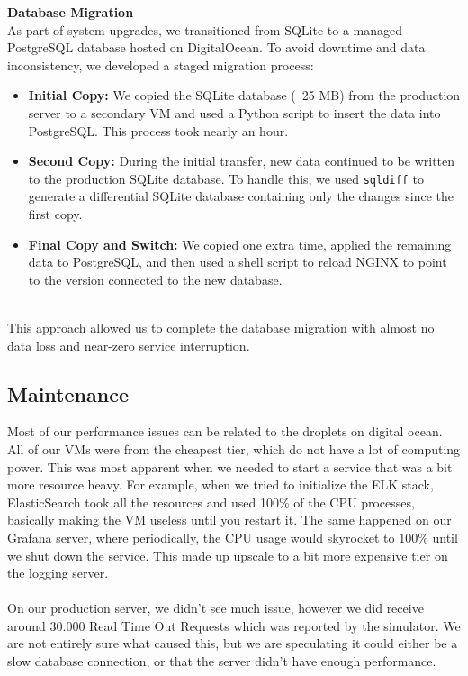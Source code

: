 \noindent \textbf{Database Migration}
\\
As part of system upgrades, we transitioned from SQLite to a managed PostgreSQL database hosted on DigitalOcean. To avoid downtime and data inconsistency, we developed a staged migration process:
\begin{itemize}
    \item \textbf{Initial Copy:} We copied the SQLite database (~25 MB) from the production server to a secondary VM and used a Python script to insert the data into PostgreSQL. This process took nearly an hour.
    \item \textbf{Second Copy:} During the initial transfer, new data continued to be written to the production SQLite database. To handle this, we used \texttt{sqldiff} to generate a differential SQLite database containing only the changes since the first copy.
    \item \textbf{Final Copy and Switch:} We copied one extra time, applied the remaining data to PostgreSQL, and then used a shell script to reload NGINX to point to the version connected to the new database.
\end{itemize}
\\
This approach allowed us to complete the database migration with almost no data loss and near-zero service interruption.

\subsection{Maintenance}

Most of our performance issues can be related to the droplets on digital ocean. All of our VMs were from the cheapest tier, which do not have a lot of computing power. This was most apparent when we needed to start a service that was a bit more resource heavy. For example, when we tried to initialize the ELK stack, ElasticSearch took all the resources and used 100\% of the CPU processes, basically making the VM useless until you restart it. The same happened on our Grafana server, where periodically, the CPU usage would skyrocket to 100\% until we shut down the service. This made up upscale to a bit more expensive tier on the logging server.
\\
\\
On our production server, we didn't see much issue, however we did receive around 30.000 Read Time Out Requests which was reported by the simulator. We are not entirely sure what caused this, but we are speculating it could either be a slow database connection, or that the server didn't have enough performance.

